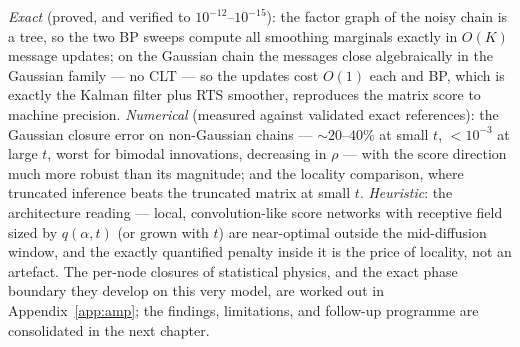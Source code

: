 \emph{Exact} (proved, and verified to $10^{-12}$--$10^{-15}$): the factor
graph of the noisy chain is a tree, so the two BP sweeps compute all
smoothing marginals exactly in $O(K)$ message updates; on the Gaussian
chain the messages close algebraically in the Gaussian family --- no CLT
--- so the updates cost $O(1)$ each and BP, which is exactly the Kalman
filter plus RTS smoother, reproduces the matrix score to machine
precision. \emph{Numerical} (measured against validated exact
references): the Gaussian closure error on non-Gaussian chains ---
$\sim\!20$--$40\%$ at small $t$, $< 10^{-3}$ at large $t$, worst for
bimodal innovations, decreasing in $\rho$ --- with the score direction
much more robust than its magnitude; and the locality comparison, where
truncated inference beats the truncated matrix at small $t$.
\emph{Heuristic}: the architecture reading --- local, convolution-like
score networks with receptive field sized by $q(\alpha, t)$ (or grown
with $t$) are near-optimal outside the mid-diffusion window, and the
exactly quantified penalty inside it is the price of locality, not an
artefact. The per-node closures of statistical physics, and the exact
phase boundary they develop on this very model, are worked out in
Appendix~\ref{app:amp}; the findings, limitations, and follow-up
programme are consolidated in the next chapter.
